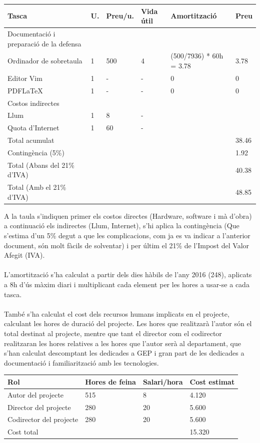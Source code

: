 \documentclass[11pt]{article}
\begin{document}
\begin{center}
\begin{tabular}{| l | l | l | l | l | l |}
		\hline
		Tasca & U. & Preu/u. & Vida útil & Amortització & Preu \\ \hline
		Documentació i preparació de la defensa & & & & & \\ \hline
		Ordinador de sobretaula & 1 & 500 & 4 & (500/7936) * 60h = 3.78 & 3.78 \\ \hline
		Editor Vim & 1 & - & - & 0 & 0 \\ \hline
		PDFLaTeX & 1 & - & - & 0 & 0 \\ \hline
		Costos indirectes & & & & & \\ \hline
		Llum & 1 & 8 & - & & \\ \hline
		Quota d'Internet & 1 & 60 & - & & \\ \hline
		Total acumulat & & & & & 38.46 \\ \hline
		Contingència (5\%) & & & & & 1.92 \\ \hline
		Total (Abans del 21\% d'IVA) & & & & & 40.38 \\ \hline
		Total (Amb el 21\% d'IVA) & & & & & 48.85 \\ \hline
		\hline
	\end{tabular}
\end{center}
A la taula s’indiquen primer els costos directes (Hardware, software i mà d’obra) a continuació els indirectes (Llum, Internet), s’hi aplica la contingència (Que s’estima d’un 5\% degut a que les complicacions, com ja es va indicar a l’anterior document, són molt fàcils de solventar) i per últim el 21\% de l’Impost del Valor Afegit (IVA). \\
\\
L’amortització s’ha calculat a partir dels dies hàbils de l’any 2016 (248), aplicats a 8h d’ús màxim diari i multiplicant cada element per les hores a usar-se a cada tasca.\\
\\
També s’ha calculat el cost dels recursos humans implicats en el projecte, calculant les hores de duració del projecte. Les hores que realitzarà l’autor són el total destinat al projecte, mentre que tant el director com el codirector realitzaran les hores relatives a les hores que l’autor serà al departament, que s’han calculat descomptant les dedicades a GEP i gran part de les dedicades a documentació i familiarització amb les tecnologies.
\begin{center}
	\begin{tabular}{| l | l | l | l |}
		\hline
		Rol & Hores de feina & Salari/hora & Cost estimat \\ \hline
		Autor del projecte & 515 & 8 & 4.120 \\ \hline
		Director del projecte & 280 & 20 & 5.600 \\ \hline
		Codirector del projecte & 280 & 20 & 5.600 \\ \hline
		Cost total & & & 15.320 \\ \hline
	\end{tabular}
\end{center}
\end{document}
